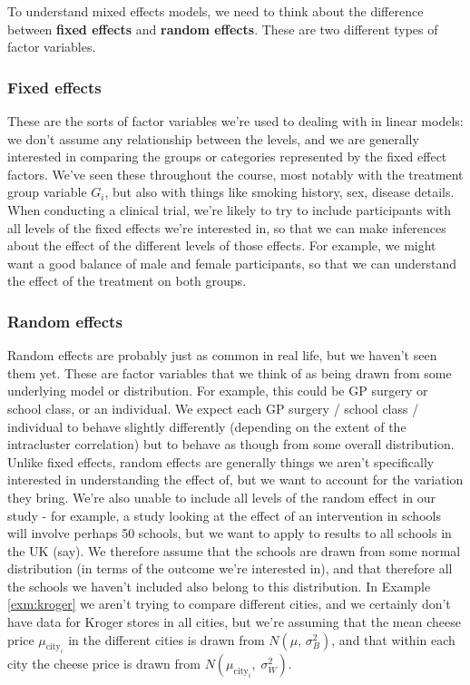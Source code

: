 \documentclass[
  openany]{book}
\theoremstyle{definition}
\theoremstyle{definition}
\theoremstyle{definition}
\theoremstyle{definition}
\theoremstyle{remark}
\begin{document}
To understand mixed effects models, we need to think about the difference between \textbf{fixed effects} and \textbf{random effects}. These are two different types of factor variables.

\hypertarget{fixed-effects}{%
\subsubsection*{Fixed effects}\label{fixed-effects}}

These are the sorts of factor variables we're used to dealing with in linear models: we don't assume any relationship between the levels, and we are generally interested in comparing the groups or categories represented by the fixed effect factors. We've seen these throughout the course, most notably with the treatment group variable \(G_i\), but also with things like smoking history, sex, disease details. When conducting a clinical trial, we're likely to try to include participants with all levels of the fixed effects we're interested in, so that we can make inferences about the effect of the different levels of those effects. For example, we might want a good balance of male and female participants, so that we can understand the effect of the treatment on both groups.

\hypertarget{random-effects}{%
\subsubsection*{Random effects}\label{random-effects}}

Random effects are probably just as common in real life, but we haven't seen them yet. These are factor variables that we think of as being drawn from some underlying model or distribution. For example, this could be GP surgery or school class, or an individual. We expect each GP surgery / school class / individual to behave slightly differently (depending on the extent of the intracluster correlation) but to behave as though from some overall distribution. Unlike fixed effects, random effects are generally things we aren't specifically interested in understanding the effect of, but we want to account for the variation they bring. We're also unable to include all levels of the random effect in our study - for example, a study looking at the effect of an intervention in schools will involve perhaps 50 schools, but we want to apply to results to all schools in the UK (say). We therefore assume that the schools are drawn from some normal distribution (in terms of the outcome we're interested in), and that therefore all the schools we haven't included also belong to this distribution. In Example \ref{exm:kroger} we aren't trying to compare different cities, and we certainly don't have data for Kroger stores in all cities, but we're assuming that the mean cheese price \(\mu_{\text{city}_i}\) in the different cities is drawn from \(N\left(\mu,\,\sigma^2_B\right)\), and that within each city the cheese price is drawn from \(N\left(\mu_{\text{city}_i},\;\sigma^2_W\right)\).
\end{document}
